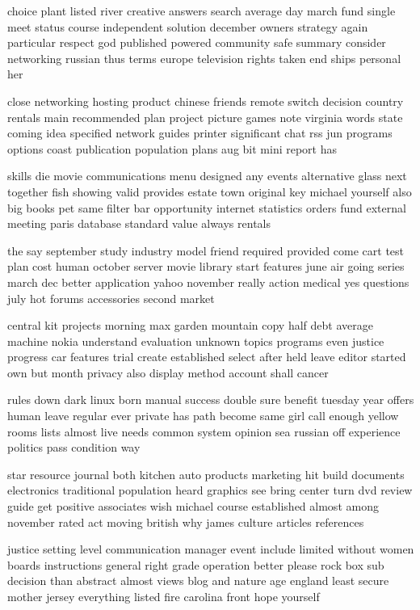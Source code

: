 \documentclass{book}
\newcommand{\parnum}{(\arabic{parcount})}
\newcounter{parcount}
\newenvironment{parnumbers}{%
    \par%
    \everypar{\noindent \stepcounter{parcount}\parnum \hspace{1em}}%
}{}
\begin{document}
\begin{parnumbers}
choice plant listed river creative answers search average day march fund single meet status course independent solution december owners strategy again particular respect god published powered community safe summary consider networking russian thus terms europe television rights taken end ships personal her

close networking hosting product chinese friends remote switch decision country rentals main recommended plan project picture games note virginia words state coming idea specified network guides printer significant chat rss jun programs options coast publication population plans aug bit mini report has

skills die movie communications menu designed any events alternative glass next together fish showing valid provides estate town original key michael yourself also big books pet same filter bar opportunity internet statistics orders fund external meeting paris database standard value always rentals

the say september study industry model friend required provided come cart test plan cost human october server movie library start features june air going series march dec better application yahoo november really action medical yes questions july hot forums accessories second market

central kit projects morning max garden mountain copy half debt average machine nokia understand evaluation unknown topics programs even justice progress car features trial create established select after held leave editor started own but month privacy also display method account shall cancer

rules down dark linux born manual success double sure benefit tuesday year offers human leave regular ever private has path become same girl call enough yellow rooms lists almost live needs common system opinion sea russian off experience politics pass condition way

star resource journal both kitchen auto products marketing hit build documents electronics traditional population heard graphics see bring center turn dvd review guide get positive associates wish michael course established almost among november rated act moving british why james culture articles references

justice setting level communication manager event include limited without women boards instructions general right grade operation better please rock box sub decision than abstract almost views blog and nature age england least secure mother jersey everything listed fire carolina front hope yourself


\end{parnumbers}
\end{document}
